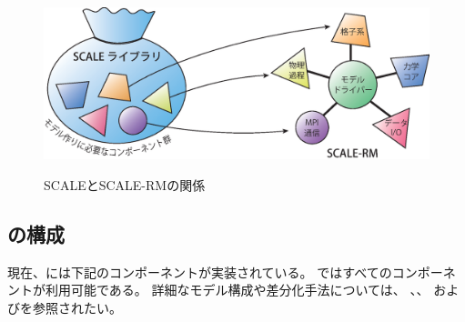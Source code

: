\begin{figure}[hbt]
\begin{center}
  \includegraphics[width=0.9\hsize]{./figure/scale.eps}\\
  \caption{SCALEとSCALE-RMの関係}
  \label{fig:scale-rm}
\end{center}
\end{figure}




\subsection{\scalerm の構成}  \label{subsec:sturcture_scale_rm}
現在、\scalerm には下記のコンポーネントが実装されている。
\scalerm ではすべてのコンポーネントが利用可能である。
詳細なモデル構成や差分化手法については、
\citet{scale_2015}、\citet{satoy_2015b}、
および\citet{nishizawa_2015}を参照されたい。\\

